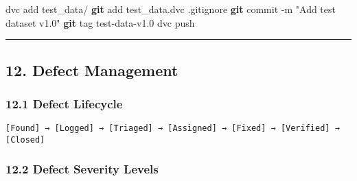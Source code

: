 \documentclass[
]{article}
\newenvironment{Shaded}{\begin{snugshade}}{\end{snugshade}}
\newcommand{\AttributeTok}[1]{\textcolor[rgb]{0.13,0.29,0.53}{#1}}
\newcommand{\ExtensionTok}[1]{#1}
\newcommand{\FunctionTok}[1]{\textcolor[rgb]{0.13,0.29,0.53}{\textbf{#1}}}
\newcommand{\NormalTok}[1]{#1}
\newcommand{\StringTok}[1]{\textcolor[rgb]{0.31,0.60,0.02}{#1}}
\begin{document}
\begin{Shaded}
\begin{Highlighting}[]
\ExtensionTok{dvc}\NormalTok{ add test\_data/}
\FunctionTok{git}\NormalTok{ add test\_data.dvc .gitignore}
\FunctionTok{git}\NormalTok{ commit }\AttributeTok{{-}m} \StringTok{"Add test dataset v1.0"}
\FunctionTok{git}\NormalTok{ tag test{-}data{-}v1.0}
\ExtensionTok{dvc}\NormalTok{ push}
\end{Highlighting}
\end{Shaded}

\begin{center}\rule{0.5\linewidth}{0.5pt}\end{center}

\hypertarget{defect-management}{%
\subsection{12. Defect Management}\label{defect-management}}

\hypertarget{defect-lifecycle}{%
\subsubsection{12.1 Defect Lifecycle}\label{defect-lifecycle}}

\begin{verbatim}
[Found] → [Logged] → [Triaged] → [Assigned] → [Fixed] → [Verified] → [Closed]
\end{verbatim}

\hypertarget{defect-severity-levels}{%
\subsubsection{12.2 Defect Severity
Levels}\label{defect-severity-levels}}
\end{document}
